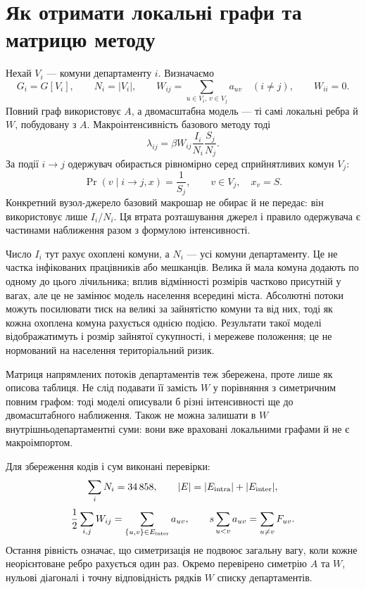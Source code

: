 \documentclass[11pt,a4paper]{article}
\begin{document}
\section{Як отримати локальні графи та матрицю методу}
Нехай $V_i$ --- комуни департаменту $i$. Визначаємо
\[
G_i=G[V_i],\qquad N_i=|V_i|,\qquad
W_{ij}=\sum_{u\in V_i,\,v\in V_j}a_{uv}\quad(i\ne j),\qquad W_{ii}=0.
\]
Повний граф використовує $A$, а двомасштабна модель --- ті самі локальні ребра й $W$, побудовану з $A$. Макроінтенсивність базового методу тоді
\[
\lambda_{ij}=\beta W_{ij}\frac{I_i}{N_i}\frac{S_j}{N_j}.
\]
За події $i\to j$ одержувач обирається рівномірно серед сприйнятливих комун $V_j$:
\[
\Pr(v\mid i\to j,x)=\frac{1}{S_j},\qquad v\in V_j,\quad x_v=S.
\]
Конкретний вузол-джерело базовий макрошар не обирає й не передає: він використовує лише $I_i/N_i$. Ця втрата розташування джерел і правило одержувача є частинами наближення разом з формулою інтенсивності.

Число $I_i$ тут рахує охоплені комуни, а $N_i$ --- усі комуни департаменту. Це не частка інфікованих працівників або мешканців. Велика й мала комуна додають по одному до цього лічильника; вплив відмінності розмірів частково присутній у вагах, але це не замінює модель населення всередині міста. Абсолютні потоки можуть посилювати тиск на великі за зайнятістю комуни та від них, тоді як кожна охоплена комуна рахується однією подією. Результати такої моделі відображатимуть і розмір зайнятої сукупності, і мережеве положення; це не нормований на населення територіальний ризик.

Матриця напрямлених потоків департаментів теж збережена, проте лише як описова таблиця. Не слід подавати її замість $W$ у порівняння з симетричним повним графом: тоді моделі описували б різні інтенсивності ще до двомасштабного наближення. Також не можна залишати в $W$ внутрішньодепартаментні суми: вони вже враховані локальними графами й не є макроімпортом.

Для збереження кодів і сум виконані перевірки:
\[
\sum_iN_i=34\,858,\qquad
|E|=|E_{\rm intra}|+|E_{\rm inter}|,
\]
\[
\frac12\sum_{i,j}W_{ij}=\sum_{\{u,v\}\in E_{\rm inter}}a_{uv},\qquad
s\sum_{u<v}a_{uv}=\sum_{u\ne v}F_{uv}.
\]
Остання рівність означає, що симетризація не подвоює загальну вагу, коли кожне неорієнтоване ребро рахується один раз. Окремо перевірено симетрію $A$ та $W$, нульові діагоналі і точну відповідність рядків $W$ списку департаментів.
\end{document}
